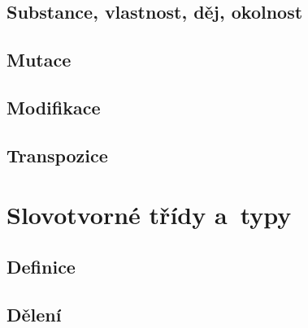 \hypertarget{substance-vlastnost-dux11bj-okolnost}{%
\subsection{Substance, vlastnost, děj,
okolnost}\label{substance-vlastnost-dux11bj-okolnost}}

\hypertarget{mutace}{%
\subsection{Mutace}\label{mutace}}

\hypertarget{modifikace}{%
\subsection{Modifikace}\label{modifikace}}

\hypertarget{transpozice}{%
\subsection{Transpozice}\label{transpozice}}

\hypertarget{slovotvornuxe9-tux159uxeddy-a-typy}{%
\section{Slovotvorné třídy
a~typy}\label{slovotvornuxe9-tux159uxeddy-a-typy}}

\hypertarget{definice}{%
\subsection{Definice}\label{definice}}

\hypertarget{dux11blenuxed}{%
\subsection{Dělení}\label{dux11blenuxed}}
